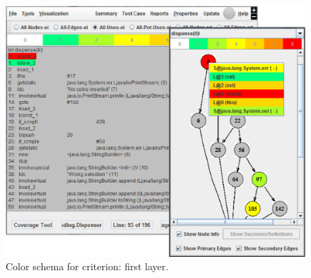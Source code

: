 
\begin{figure}[!ht]
\begin{center}
\includegraphics[height=0.40\textheight]{fig/pri-uses-layer1.eps}
\caption{\label{fig:uses-color} Color schema for 
criterion: first layer.}
\end{center}
\end{figure}
